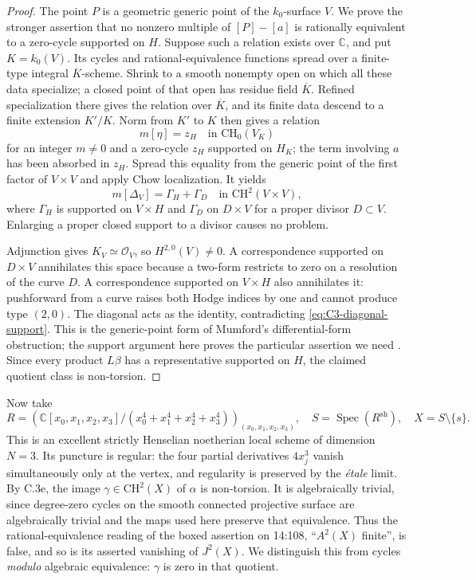 \begin{proof}
The point $P$ is a geometric generic point of the $k_0$-surface $V$.
We prove the stronger assertion that no nonzero multiple of
$[P]-[a]$ is rationally equivalent to a zero-cycle supported on $H$.
Suppose such a relation exists over $\mathbb C$, and put
$K=k_0(V)$. Its cycles and rational-equivalence functions spread over
a finite-type integral $\overline K$-scheme. Shrink to a smooth
nonempty open on which all these data specialize; a closed point of
that open has residue field $\overline K$. Refined specialization
there gives the relation over $\overline K$, and its finite data
descend to a finite extension $K'/K$. Norm from $K'$ to $K$ then
gives a relation
\[
                   m[\eta]=z_H\quad\text{in }\mathrm{CH}_0(V_K)
\]
for an integer $m\ne0$ and a zero-cycle $z_H$ supported on $H_K$;
the term involving $a$ has been absorbed in $z_H$.
Spread this equality from the generic point of the first factor of
$V\times V$ and apply Chow localization. It yields
\begin{equation}\label{eq:C3-diagonal-support}
 m[\Delta_V]=\Gamma_H+\Gamma_D
                   \quad\text{in }\mathrm{CH}^2(V\times V),
\end{equation}
where $\Gamma_H$ is supported on $V\times H$ and $\Gamma_D$ on
$D\times V$ for a proper divisor $D\subset V$.
Enlarging a proper closed support to a divisor causes no problem.

Adjunction gives $K_V\simeq\mathcal O_V$, so
$H^{2,0}(V)\ne0$. A correspondence supported on $D\times V$
annihilates this space because a two-form restricts to zero on a
resolution of the curve $D$. A correspondence supported on
$V\times H$ also annihilates it: pushforward from a curve raises
both Hodge indices by one and cannot produce type $(2,0)$.
The diagonal acts as the identity, contradicting
\eqref{eq:C3-diagonal-support}. This is the generic-point form of
Mumford's differential-form obstruction; the support argument here
proves the particular assertion we need
\citep[Section 2, Lemmas 2--3 and main theorem]{cyMumford1969}.
Since every product $L\beta$ has a representative supported on $H$,
the claimed quotient class is non-torsion.
\end{proof}

Now take
\[
 R=\left(\mathbb C[x_0,x_1,x_2,x_3]/
                   (x_0^4+x_1^4+x_2^4+x_3^4)\right)_{(x_0,x_1,x_2,x_3)},
 \quad S=\operatorname{Spec}(R^{\mathrm{sh}}),\quad X=S\setminus\{s\}.
\]
This is an excellent strictly Henselian noetherian local scheme of
dimension $N=3$. Its puncture is regular: the four partial derivatives
$4x_j^3$ vanish simultaneously only at the vertex, and regularity
is preserved by the \emph{\'etale} limit. By C.3e, the image
$\gamma\in\mathrm{CH}^2(X)$ of $\alpha$ is non-torsion.
It is algebraically trivial, since degree-zero cycles on the smooth
connected projective surface are algebraically trivial and the maps
used here preserve that equivalence. Thus the rational-equivalence
reading of the boxed assertion on 14:108,
``$A^2(X)$ finite'', is false, and so is its asserted vanishing of
$J^2(X)$. We distinguish this from cycles \emph{modulo} algebraic
equivalence: $\gamma$ is zero in that quotient.

